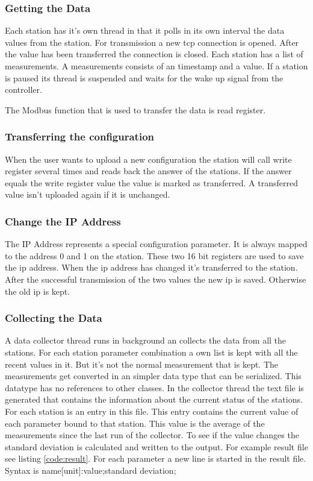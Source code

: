 \subsubsection{Getting the Data} %
\label{ssub:getting_the_data}
Each station has it's own thread in that it polls in its own interval the data values from the station. For transmission a new tcp connection is opened. After the value has been transferred the connection is closed. Each station has a list of measurements. A measurements consists of an timestamp and a value. If a station is paused its thread is suspended and waits for the wake up signal from the controller. 

The Modbus function that is used to transfer the data is read register.

\subsubsection{Transferring the configuration} %
\label{ssub:transferring_the_configuration}
When the user wants to upload a new configuration the station will call write register several times and reads back the answer of the stations. If the answer equals the write register value the value is marked as transferred. A transferred value isn't uploaded again if it is unchanged.
\subsubsection{Change the IP Address} %
\label{ssub:change_the_ip_address}
The IP Address represents a special configuration parameter. It is always mapped to the address 0 and 1 on the station. These two 16 bit registers are used to save the ip address. When the ip address has changed it's transferred to the station. After the successful transmission of the two values the new ip is saved. Otherwise the old ip is kept.


\subsubsection{Collecting the Data} %
\label{ssub:collecting_the_data}
A data collector thread runs in background an collects the data from all the stations. For each station parameter combination a own list is kept with all the recent values in it. But it's not the normal measurement that is kept. The measurements get converted in an simpler data type that can be serialized. This datatype has no references to other classes. In the collector thread the text file is generated that contains the information about the current status of the stations. For each station is an entry in this file. This entry contains the current value of each parameter bound to that station. This value is the average of the measurements since the last run of the collector. To see if the value changes the standard deviation is calculated and written to the output. For example result file see listing \ref{code:result}. 
For each parameter a new line is started in the result file. Syntax is {\C name[unit]:value;standard deviation;}

